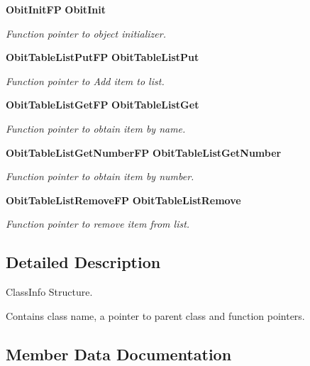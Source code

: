\begin{CompactItemize}
{\bf Obit\-Init\-FP} {\bf Obit\-Init}
\begin{CompactList}\small\item\em Function pointer to object initializer. \item\end{CompactList}\item 
{\bf Obit\-Table\-List\-Put\-FP} {\bf Obit\-Table\-List\-Put}
\begin{CompactList}\small\item\em Function pointer to Add item to list. \item\end{CompactList}\item 
{\bf Obit\-Table\-List\-Get\-FP} {\bf Obit\-Table\-List\-Get}
\begin{CompactList}\small\item\em Function pointer to obtain item by name. \item\end{CompactList}\item 
{\bf Obit\-Table\-List\-Get\-Number\-FP} {\bf Obit\-Table\-List\-Get\-Number}
\begin{CompactList}\small\item\em Function pointer to obtain item by number. \item\end{CompactList}\item 
{\bf Obit\-Table\-List\-Remove\-FP} {\bf Obit\-Table\-List\-Remove}
\begin{CompactList}\small\item\em Function pointer to remove item from list. \item\end{CompactList}\end{CompactItemize}


\subsection{Detailed Description}
Class\-Info Structure. 

Contains class name, a pointer to parent class and function pointers. 



\subsection{Member Data Documentation}
